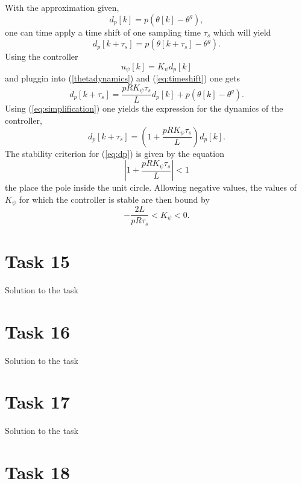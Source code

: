 \documentclass[a4paper,12pt,oneside,onecolumn]{article} %
\begin{document}
With the approximation given,
\begin{equation}
\label{eq:simplification}
d_p[k] = p(\theta[k] - \theta^g),
\end{equation}
one can time apply a time shift of one sampling time $\tau_s$ which will yield
\begin{equation}
\label{eq:timeshift}
d_p[k + \tau_s] = p(\theta[k + \tau_s] - \theta^g).
\end{equation}
Using the controller 
\begin{equation}
u_\psi[k] = K_\psi d_p[k]
\end{equation}
and pluggin into (\ref{thetadynamics}) and (\ref{eq:timeshift}) one gets
\begin{equation}
d_p[k + \tau_s] = \frac{p R K_\psi \tau_s}{L} d_p[k] + p(\theta[k] - \theta^g).
\end{equation}
Using (\ref{eq:simplification}) one yields the expression for the dynamics of the controller,
\begin{equation}
\label{eq:dp}
d_p[k+\tau_s] = \left ( 1 + \frac{p R K_\psi \tau_s}{L} \right ) d_p[k].
\end{equation}
The stability criterion for (\ref{eq:dp}) is given by the equation
\begin{equation}
\left | 1 + \frac{p R K_\psi \tau_s}{L} \right | < 1
\end{equation}
the place the pole inside the unit circle.
Allowing negative values, the values of $K_\psi$ for which the controller is stable are then bound by
\begin{equation}
-\frac{2L}{p R \tau_s} < K_\psi < 0.
\end{equation}
\section*{Task 15}

Solution to the task

\section*{Task 16}

Solution to the task

\section*{Task 17}

Solution to the task

\section*{Task 18}
\end{document}
